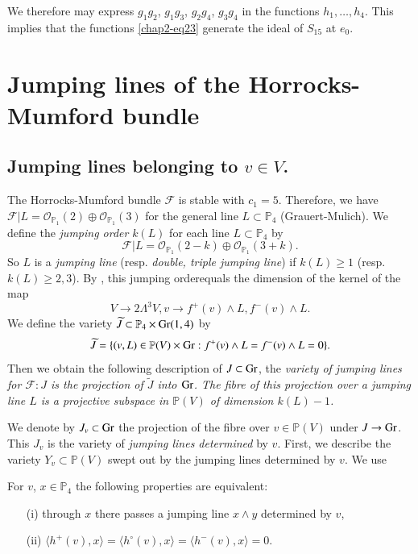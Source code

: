 We therefore may express $g_{1}g_{2}$, $g_{1}g_{3}$, $g_{2}g_{4}$,
$g_{3}g_{4}$ in the functions $h_{1},\ldots,h_{4}$. This implies that
the functions \eqref{chap2-eq23} generate the ideal of $S_{15}$ at
$e_{0}$. 

\section{Jumping lines of the Horrocks-Mumford
bundle}\label{chap2-sec5}

\subsection{Jumping lines belonging to \texorpdfstring{$v\in V$}{vV}.}\label{chap2-sec5.1}

The Horrocks-Mumford bundle $\mathscr{F}$ is stable with
$c_{1}=5$. Therefore, we have
$\mathscr{F}|L=\mathscr{O}_{\mathbb{P}_{1}}(2)\oplus \mathscr{O}_{\mathbb{P}_{1}}(3)$
for the general line $L\subset \mathbb{P}_{4}$ (Grauert-Mulich). We
define the {\em jumping order} $k(L)$ for each line
$L\subset \mathbb{P}_{4}$ by
$$
\mathscr{F}|L=\mathscr{O}_{\mathbb{P}_{1}}(2-k)\oplus \mathscr{O}_{\mathbb{P}_{1}}(3+k). 
$$
So $L$ is a {\em jumping line} (resp. {\em double, triple jumping
line}) if $k(L)\geq 1$ (resp. $k(L)\geq 2,3$). By \cite[proposition
1]{chap2-key1}, this jumping order\pageoriginale equals the dimension of the kernel
of the map
$$
V\to 2\Lambda^{3}V, v\to f^{+}(v)\wedge L, f^{-}(v)\wedge L.
$$
We define the variety
$\widetilde{J}\subset \mathbb{P}_{4}\times \operatorname{Gr}(1,4)$ by
$$
\widetilde{J}=\{(v,L)\in \mathbb{P}(V)\times \operatorname{Gr}:f^{+}(v)\wedge
L=f^{-}(v)\wedge L=0\}. 
$$
Then we obtain the following description of $J\subset \operatorname{Gr}$, the {\em
variety of jumping lines for $\mathscr{F}:J$ is the projection of
$\widetilde{J}$ into $\operatorname{Gr}$. The fibre of this projection over a
jumping line $L$ is a projective subspace in $\mathbb{P}(V)$ of
dimension $k(L)-1$.}

We denote by $J_{v}\subset \operatorname{Gr}$ the projection of the fibre over
$v\in \mathbb{P}(V)$ under $J\to \operatorname{Gr}$. This $J_{v}$ is the variety of
{\em jumping lines determined} by $v$. First, we describe the variety
$Y_{v}\subset \mathbb{P}(V)$ swept out by the jumping lines determined
by $v$. We use

\begin{lemma}\label{chap2-lem13}
For $v$, $x\in \mathbb{P}_{4}$ the following properties are
equivalent:
\begin{itemize}
\item[\rm(i)] through $x$ there passes a jumping line $x\wedge y$
determined by $v$,

\item[\rm(ii)] $\langle h^{+}(v),x\rangle=\langle
h^{\circ}(v),x\rangle=\langle h^{-}(v),x\rangle=0$.
\end{itemize}
\end{lemma}

